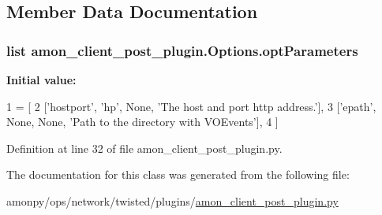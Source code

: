 \subsection{Member Data Documentation}
\hypertarget{classamon__client__post__plugin_1_1_options_a3ef4603fe9e534ae26702c562ad5dbb0}{
\subsubsection[{opt\-Parameters}]{\setlength{\rightskip}{0pt plus 5cm}list amon\-\_\-client\-\_\-post\-\_\-plugin.\-Options.\-opt\-Parameters\hspace{0.3cm}{\ttfamily [static]}}}\label{classamon__client__post__plugin_1_1_options_a3ef4603fe9e534ae26702c562ad5dbb0}
{\bfseries Initial value\-:}
\begin{DoxyCode}
1 = [
2         [\textcolor{stringliteral}{'hostport'}, \textcolor{stringliteral}{'hp'}, \textcolor{keywordtype}{None}, \textcolor{stringliteral}{'The host and port http address.'}],
3         [\textcolor{stringliteral}{'epath'}, \textcolor{keywordtype}{None}, \textcolor{keywordtype}{None}, \textcolor{stringliteral}{'Path to the directory with VOEvents'}],
4         ]
\end{DoxyCode}


Definition at line 32 of file amon\-\_\-client\-\_\-post\-\_\-plugin.\-py.



The documentation for this class was generated from the following file\-:\begin{DoxyCompactItemize}
\item 
amonpy/ops/network/twisted/plugins/\hyperlink{amon__client__post__plugin_8py}{amon\-\_\-client\-\_\-post\-\_\-plugin.\-py}\end{DoxyCompactItemize}

